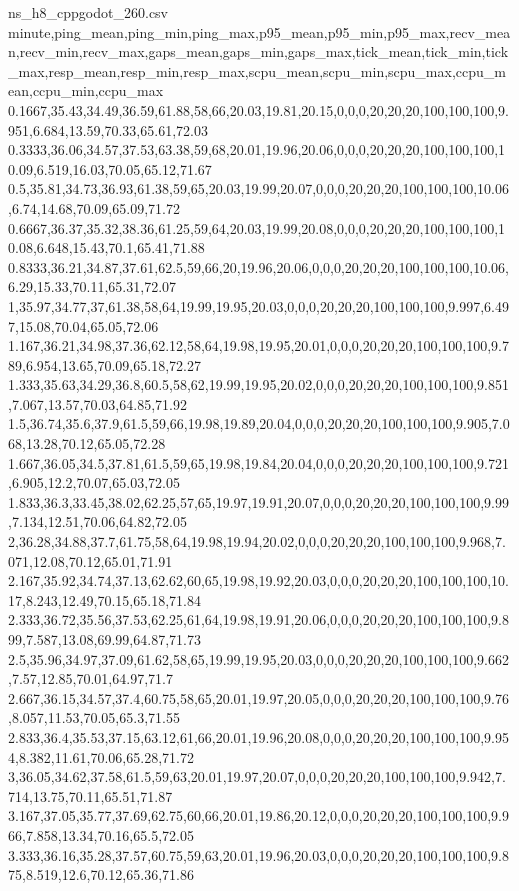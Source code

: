 \begin{filecontents*}[overwrite]{ns_h8_cppgodot_260.csv}
minute,ping_mean,ping_min,ping_max,p95_mean,p95_min,p95_max,recv_mean,recv_min,recv_max,gaps_mean,gaps_min,gaps_max,tick_mean,tick_min,tick_max,resp_mean,resp_min,resp_max,scpu_mean,scpu_min,scpu_max,ccpu_mean,ccpu_min,ccpu_max
0.1667,35.43,34.49,36.59,61.88,58,66,20.03,19.81,20.15,0,0,0,20,20,20,100,100,100,9.951,6.684,13.59,70.33,65.61,72.03
0.3333,36.06,34.57,37.53,63.38,59,68,20.01,19.96,20.06,0,0,0,20,20,20,100,100,100,10.09,6.519,16.03,70.05,65.12,71.67
0.5,35.81,34.73,36.93,61.38,59,65,20.03,19.99,20.07,0,0,0,20,20,20,100,100,100,10.06,6.74,14.68,70.09,65.09,71.72
0.6667,36.37,35.32,38.36,61.25,59,64,20.03,19.99,20.08,0,0,0,20,20,20,100,100,100,10.08,6.648,15.43,70.1,65.41,71.88
0.8333,36.21,34.87,37.61,62.5,59,66,20,19.96,20.06,0,0,0,20,20,20,100,100,100,10.06,6.29,15.33,70.11,65.31,72.07
1,35.97,34.77,37,61.38,58,64,19.99,19.95,20.03,0,0,0,20,20,20,100,100,100,9.997,6.497,15.08,70.04,65.05,72.06
1.167,36.21,34.98,37.36,62.12,58,64,19.98,19.95,20.01,0,0,0,20,20,20,100,100,100,9.789,6.954,13.65,70.09,65.18,72.27
1.333,35.63,34.29,36.8,60.5,58,62,19.99,19.95,20.02,0,0,0,20,20,20,100,100,100,9.851,7.067,13.57,70.03,64.85,71.92
1.5,36.74,35.6,37.9,61.5,59,66,19.98,19.89,20.04,0,0,0,20,20,20,100,100,100,9.905,7.068,13.28,70.12,65.05,72.28
1.667,36.05,34.5,37.81,61.5,59,65,19.98,19.84,20.04,0,0,0,20,20,20,100,100,100,9.721,6.905,12.2,70.07,65.03,72.05
1.833,36.3,33.45,38.02,62.25,57,65,19.97,19.91,20.07,0,0,0,20,20,20,100,100,100,9.99,7.134,12.51,70.06,64.82,72.05
2,36.28,34.88,37.7,61.75,58,64,19.98,19.94,20.02,0,0,0,20,20,20,100,100,100,9.968,7.071,12.08,70.12,65.01,71.91
2.167,35.92,34.74,37.13,62.62,60,65,19.98,19.92,20.03,0,0,0,20,20,20,100,100,100,10.17,8.243,12.49,70.15,65.18,71.84
2.333,36.72,35.56,37.53,62.25,61,64,19.98,19.91,20.06,0,0,0,20,20,20,100,100,100,9.899,7.587,13.08,69.99,64.87,71.73
2.5,35.96,34.97,37.09,61.62,58,65,19.99,19.95,20.03,0,0,0,20,20,20,100,100,100,9.662,7.57,12.85,70.01,64.97,71.7
2.667,36.15,34.57,37.4,60.75,58,65,20.01,19.97,20.05,0,0,0,20,20,20,100,100,100,9.76,8.057,11.53,70.05,65.3,71.55
2.833,36.4,35.53,37.15,63.12,61,66,20.01,19.96,20.08,0,0,0,20,20,20,100,100,100,9.954,8.382,11.61,70.06,65.28,71.72
3,36.05,34.62,37.58,61.5,59,63,20.01,19.97,20.07,0,0,0,20,20,20,100,100,100,9.942,7.714,13.75,70.11,65.51,71.87
3.167,37.05,35.77,37.69,62.75,60,66,20.01,19.86,20.12,0,0,0,20,20,20,100,100,100,9.966,7.858,13.34,70.16,65.5,72.05
3.333,36.16,35.28,37.57,60.75,59,63,20.01,19.96,20.03,0,0,0,20,20,20,100,100,100,9.875,8.519,12.6,70.12,65.36,71.86

\end{filecontents*}
